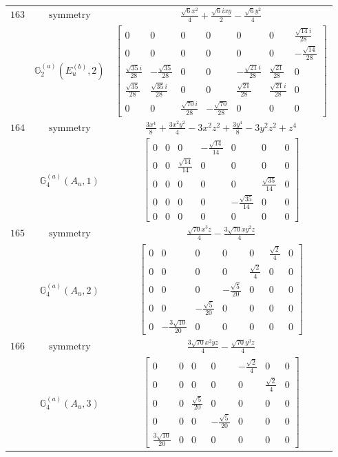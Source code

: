 \documentclass[fleqn,8pt,landscape]{jsarticle}
\begin{document}
\begin{longtable}{ccc}
$ 163 $ & $ \text{symmetry} $ & $ \frac{\sqrt{6} x^{2}}{4} + \frac{\sqrt{6} i x y}{2} - \frac{\sqrt{6} y^{2}}{4} $ \\
$  $ & $ \mathbb{G}_{2}^{(a)}(E_{u}^{(b)},2) $ & $ \begin{bmatrix} 0 & 0 & 0 & 0 & 0 & 0 & \frac{\sqrt{14} i}{28} \\ 0 & 0 & 0 & 0 & 0 & 0 & - \frac{\sqrt{14}}{28} \\ \frac{\sqrt{35} i}{28} & - \frac{\sqrt{35}}{28} & 0 & 0 & - \frac{\sqrt{21} i}{28} & \frac{\sqrt{21}}{28} & 0 \\ \frac{\sqrt{35}}{28} & \frac{\sqrt{35} i}{28} & 0 & 0 & \frac{\sqrt{21}}{28} & \frac{\sqrt{21} i}{28} & 0 \\ 0 & 0 & \frac{\sqrt{70} i}{28} & - \frac{\sqrt{70}}{28} & 0 & 0 & 0 \end{bmatrix} $ \\ \hline
$ 164 $ & $ \text{symmetry} $ & $ \frac{3 x^{4}}{8} + \frac{3 x^{2} y^{2}}{4} - 3 x^{2} z^{2} + \frac{3 y^{4}}{8} - 3 y^{2} z^{2} + z^{4} $ \\
$  $ & $ \mathbb{G}_{4}^{(a)}(A_{u},1) $ & $ \begin{bmatrix} 0 & 0 & 0 & - \frac{\sqrt{14}}{14} & 0 & 0 & 0 \\ 0 & 0 & \frac{\sqrt{14}}{14} & 0 & 0 & 0 & 0 \\ 0 & 0 & 0 & 0 & 0 & \frac{\sqrt{35}}{14} & 0 \\ 0 & 0 & 0 & 0 & - \frac{\sqrt{35}}{14} & 0 & 0 \\ 0 & 0 & 0 & 0 & 0 & 0 & 0 \end{bmatrix} $ \\ \hline
$ 165 $ & $ \text{symmetry} $ & $ \frac{\sqrt{70} x^{3} z}{4} - \frac{3 \sqrt{70} x y^{2} z}{4} $ \\
$  $ & $ \mathbb{G}_{4}^{(a)}(A_{u},2) $ & $ \begin{bmatrix} 0 & 0 & 0 & 0 & 0 & \frac{\sqrt{2}}{4} & 0 \\ 0 & 0 & 0 & 0 & \frac{\sqrt{2}}{4} & 0 & 0 \\ 0 & 0 & 0 & - \frac{\sqrt{5}}{20} & 0 & 0 & 0 \\ 0 & 0 & - \frac{\sqrt{5}}{20} & 0 & 0 & 0 & 0 \\ 0 & - \frac{3 \sqrt{10}}{20} & 0 & 0 & 0 & 0 & 0 \end{bmatrix} $ \\ \hline
$ 166 $ & $ \text{symmetry} $ & $ \frac{3 \sqrt{70} x^{2} y z}{4} - \frac{\sqrt{70} y^{3} z}{4} $ \\
$  $ & $ \mathbb{G}_{4}^{(a)}(A_{u},3) $ & $ \begin{bmatrix} 0 & 0 & 0 & 0 & - \frac{\sqrt{2}}{4} & 0 & 0 \\ 0 & 0 & 0 & 0 & 0 & \frac{\sqrt{2}}{4} & 0 \\ 0 & 0 & \frac{\sqrt{5}}{20} & 0 & 0 & 0 & 0 \\ 0 & 0 & 0 & - \frac{\sqrt{5}}{20} & 0 & 0 & 0 \\ \frac{3 \sqrt{10}}{20} & 0 & 0 & 0 & 0 & 0 & 0 \end{bmatrix} $ \\ \hline

\end{longtable}
\end{document}
